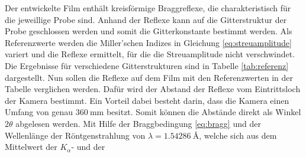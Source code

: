 Der entwickelte Film enthält kreisförmige Braggreflexe, die charakteristisch für die jeweillige Probe sind. Anhand der Reflexe kann auf die Gitterstruktur der
Probe geschlossen werden und somit die Gitterkonstante bestimmt werden.
Als Referenzwerte werden die Miller'schen Indizes in Gleichung \eqref{eq:streuamplitude} variert und die Reflexe ermittelt, für die die Streuamplitude nicht verschwindet.
Die Ergebnisse für
verschiedene Gitterstrukturen sind in Tabelle \ref{tab:referenz} dargestellt.\newline
Nun sollen die Reflexe auf dem Film mit den Referenzwerten in der Tabelle verglichen werden. Dafür wird der Abstand der Reflexe vom Eintrittsloch der Kamera bestimmt. Ein
Vorteil dabei besteht darin, dass die Kamera einen Umfang von genau $\SI{360}{\milli\meter}$ besitzt. Somit können die Abstände direkt als Winkel
$2\theta$ abgelesen werden. Mit Hilfe der Braggbedingung \eqref{eq:bragg} und der Wellenlänge der Röntgenstrahlung von
$\lambda = \SI{1,54286}{\angstrom}$, welche sich aus dem Mittelwert der $K_\alpha$- und der
